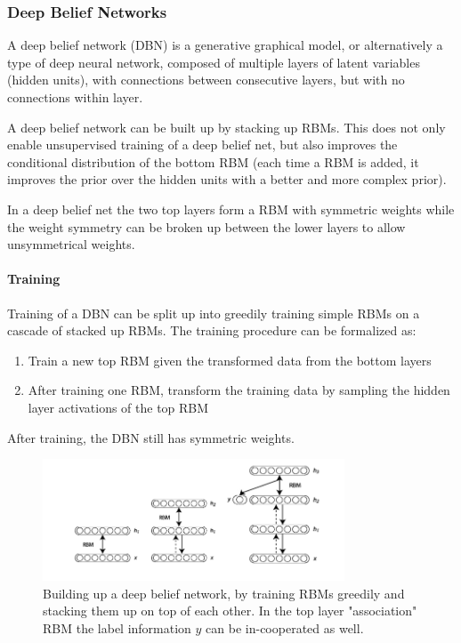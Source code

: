\subsubsection{Deep Belief Networks}

A deep belief network (DBN) is a generative graphical model, or alternatively a type of deep neural network, composed of multiple layers of latent variables (hidden units), with connections between consecutive layers, but with no connections within layer.

A deep belief network can be built up by stacking up RBMs.
This does not only enable unsupervised training of a deep belief net, but also improves the conditional distribution of the bottom RBM (each time a RBM is added, it improves the prior over the hidden units with a better and more complex prior).

In a deep belief net the two top layers form a RBM with symmetric weights while the weight symmetry can be broken up between the lower layers to allow unsymmetrical weights.   

\paragraph{Training} 

Training of a DBN can be split up into greedily training simple RBMs on a cascade of stacked up RBMs.
The training procedure can be formalized as:  
\begin{enumerate}
\item Train a new top RBM given the transformed data from the bottom layers
\item After training one RBM, transform the training data by sampling the hidden layer activations of the top RBM
\end{enumerate}

After training, the DBN still has symmetric weights. 

\begin{figure}
	\centering
    	\includegraphics[width=0.8\textwidth]{imgs/dbn_stacking.png} 
    \caption{Building up a deep belief network, by training RBMs greedily and stacking them up on top of each other. In the top layer "association" RBM the label information $y$ can be in-cooperated as well.}
	\label{fig:dbn}
\end{figure}

